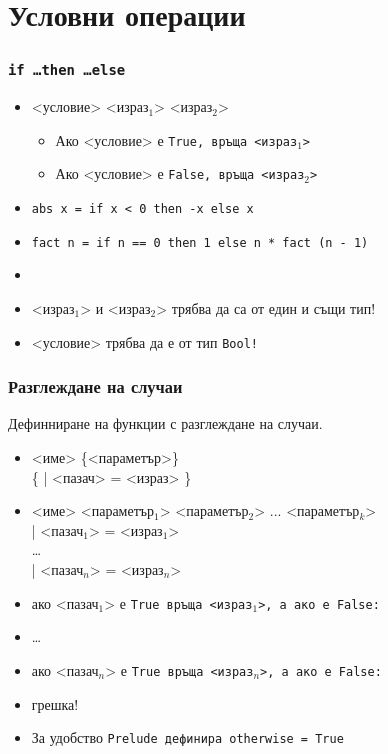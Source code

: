\documentclass{beamer}
\begin{document}
\section{Условни операции}

\begin{frame}
  \frametitle{\tt{if} \ldots \tt{then} \ldots \tt{else}}
  \begin{itemize}[<+->]
  \item {} <условие>  <израз$_1$>  <израз$_2$>
    \begin{itemize}[<.->]
    \item Ако <условие> е \tt{True}, връща <израз$_1$>
    \item Ако <условие> е \tt{False}, връща <израз$_2$>
    \end{itemize}
  \item \tt{abs x = if x < 0 then -x else x}
  \item \tt{fact n = if n == 0 then 1 else n * fact (n - 1)}
  \item {}
  \item \alert{<израз$_1$> и <израз$_2$> трябва да са от един и същи тип!}
  \item \alert{<условие> трябва да е от тип \tt{Bool}!}
  \end{itemize}
\end{frame}

\begin{frame}[fragile]
  \frametitle{Разглеждане на случаи}
  Дефинниране на функции с разглеждане на случаи.
  \begin{itemize}
    \item{} <име> \{<параметър>\}\\
      \hspace{3ex} \{ \tta| <пазач> \tta= <израз> \}
    \item{} <име> <параметър$_1$> <параметър$_2$> ... <параметър$_k$>\\
      \hspace{3ex} \tta| <пазач$_1$> \tta= <израз$_1$>\\
      \ldots\\
      \hspace{3ex} \tta| <пазач$_n$> \tta= <израз$_n$>\\
  \item ако <пазач$_1$> е \tt{True} връща <израз$_1$>, а ако е \tt{False}:
  \item \ldots
  \item ако <пазач$_n$> е \tt{True} връща <израз$_n$>, а ако е \tt{False}:
  \item \alert{грешка!}
  \item За удобство \tt{Prelude} дефинира \tt{otherwise = True}
  \end{itemize}
\end{frame}
\end{document}
